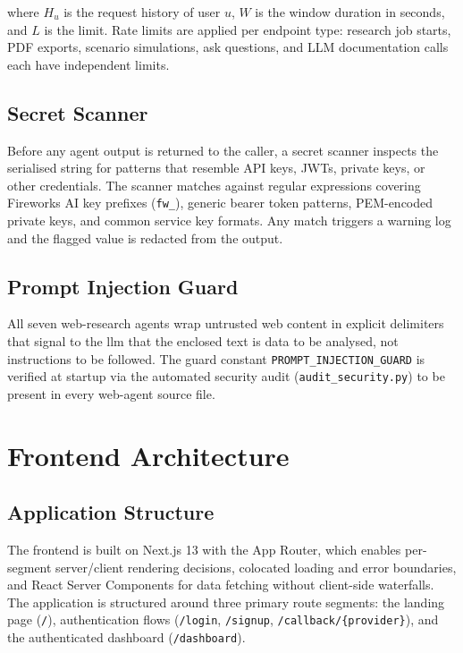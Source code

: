 \documentclass[12pt,a4paper,oneside]{book}
\begin{document}
where $H_u$ is the request history of user $u$, $W$ is the window duration in seconds, and $L$ is the limit. Rate limits are applied per endpoint type: research job starts, PDF exports, scenario simulations, ask questions, and LLM documentation calls each have independent limits.

\section{Secret Scanner}

Before any agent output is returned to the caller, a secret scanner inspects the serialised string for patterns that resemble API keys, JWTs, private keys, or other credentials. The scanner matches against regular expressions covering Fireworks AI key prefixes (\texttt{fw\_}), generic bearer token patterns, PEM-encoded private keys, and common service key formats. Any match triggers a warning log and the flagged value is redacted from the output.

\section{Prompt Injection Guard}

All seven web-research agents wrap untrusted web content in explicit delimiters that signal to the \gls{llm} that the enclosed text is data to be analysed, not instructions to be followed. The guard constant \texttt{PROMPT\_INJECTION\_GUARD} is verified at startup via the automated security audit (\texttt{audit\_security.py}) to be present in every web-agent source file.

\chapter{Frontend Architecture}
\label{chap:frontend}

\section{Application Structure}

The frontend is built on Next.js 13 with the App Router, which enables per-segment server/client rendering decisions, colocated loading and error boundaries, and React Server Components for data fetching without client-side waterfalls. The application is structured around three primary route segments: the landing page (\texttt{/}), authentication flows (\texttt{/login}, \texttt{/signup}, \texttt{/callback/\{provider\}}), and the authenticated dashboard (\texttt{/dashboard}).
\end{document}
